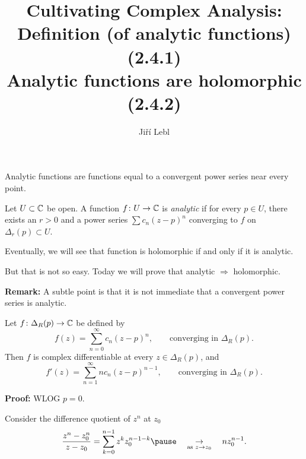 \documentclass[10pt,aspectratio=169]{beamer}
\author{Ji\v{r}\'i Lebl}
\institute[OSU]{%
Departemento pri Matematiko de Oklahoma {\^S}tata Universitato}
\title{Cultivating Complex Analysis:\\%
Definition (of analytic functions) (2.4.1)\\%
Analytic functions are holomorphic (2.4.2)}
\date{}
\begin{document}
\begin{frame}
\titlepage
\end{frame}


\begin{frame}

Analytic functions are functions equal to
a convergent power series near every point.

\begin{definition}
Let $U \subset {\mathbb{C}}$ be open.  A function $f \colon U \to {\mathbb{C}}$
is \emph{analytic}
if for every $p \in U$, there exists 
an $r > 0$ and a
power series $\sum c_n {(z-p)}^n$ converging to $f$ on $\Delta_r(p) \subset
U$.
\end{definition}

\pause

Eventually, we will see that function is holomorphic if and only if it is
analytic.

\pause
\medskip

But that is not so easy.  Today we will prove that analytic $\Rightarrow$
holomorphic.

\pause
\medskip

\textbf{Remark:}
A subtle point is that it is not immediate that a convergent power series is 
analytic.

\end{frame}

\begin{frame}
\begin{proposition}
Let $f \colon \Delta_R(p) \to {\mathbb{C}}$ be defined by
\begin{equation*}
f(z) = \sum_{n=0}^\infty c_n {(z-p)}^n ,
\qquad \text{converging in } \Delta_R(p) .
\end{equation*}
\pause
Then $f$ is complex differentiable at every $z \in \Delta_R(p)$, and
\begin{equation*}
f'(z) = \sum_{n=1}^\infty n c_n {(z-p)}^{n-1} ,
\qquad \text{converging in } \Delta_R(p) .
\end{equation*}
\end{proposition}

\pause

\textbf{Proof:}
WLOG $p=0$.

\medskip
\pause

Consider the difference quotient of $z^n$ at $z_0$
\[
\frac{z^n-z_0^n}{z-z_0}
=
\sum_{k=0}^{n-1}
z^k z_0^{n-1-k} 
\pause
\quad
\underset{\text{as } z \to z_0}{\to}
\quad n z_0^{n-1} .
\]

\end{frame}
\end{document}
